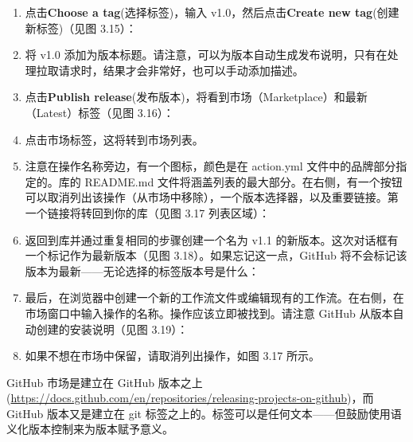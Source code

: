 \begin{enumerate}
\item 
点击\textbf{Choose a tag}(选择标签)，输入 v1.0，然后点击\textbf{Create new tag}(创建新标签)（见图 3.15）：


\item 
将 v1.0 添加为版本标题。请注意，可以为版本自动生成发布说明，只有在处理拉取请求时，结果才会非常好，也可以手动添加描述。

\item 
点击\textbf{Publish release}(发布版本)，将看到市场（Marketplace）和最新（Latest）标签（见图 3.16）：


\item 
点击市场标签，这将转到市场列表。

\item 
注意在操作名称旁边，有一个图标，颜色是在 action.yml 文件中的品牌部分指定的。库的 README.md 文件将涵盖列表的最大部分。在右侧，有一个按钮可以取消列出该操作（从市场中移除），一个版本选择器，以及重要链接。第一个链接将转回到你的库（见图 3.17 列表区域）：


\item 
返回到库并通过重复相同的步骤创建一个名为 v1.1 的新版本。这次对话框有一个标记作为最新版本（见图 3.18）。如果忘记这一点，GitHub 将不会标记该版本为最新——无论选择的标签版本号是什么：


\item 
最后，在浏览器中创建一个新的工作流文件或编辑现有的工作流。在右侧，在市场窗口中输入操作的名称。操作应该立即被找到。请注意 GitHub 从版本自动创建的安装说明（见图 3.19）：


\item 
如果不想在市场中保留，请取消列出操作，如图 3.17 所示。
\end{enumerate}


GitHub 市场是建立在 GitHub 版本之上(\url{https://docs.github.com/en/repositories/releasing-projects-on-github})，而 GitHub 版本又是建立在 git 标签之上的。标签可以是任何文本——但鼓励使用语义化版本控制来为版本赋予意义。

